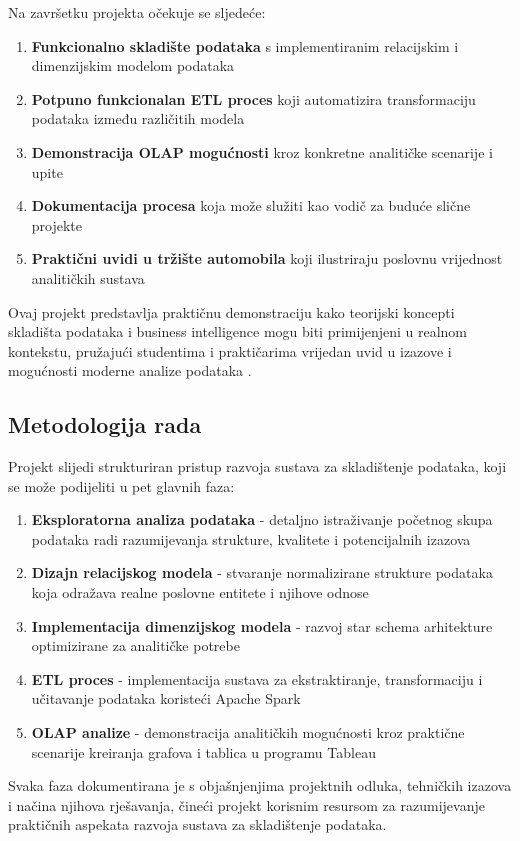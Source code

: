 Na završetku projekta očekuje se sljedeće:

\begin{enumerate}
    \item \textbf{Funkcionalno skladište podataka} s implementiranim relacijskim i dimenzijskim modelom podataka
    \item \textbf{Potpuno funkcionalan ETL proces} koji automatizira transformaciju podataka između različitih modela
    \item \textbf{Demonstracija OLAP mogućnosti} kroz konkretne analitičke scenarije i upite
    \item \textbf{Dokumentacija procesa} koja može služiti kao vodič za buduće slične projekte
    \item \textbf{Praktični uvidi u tržište automobila} koji ilustriraju poslovnu vrijednost analitičkih sustava
\end{enumerate}

Ovaj projekt predstavlja praktičnu demonstraciju kako teorijski koncepti skladišta podataka i business intelligence mogu biti primijenjeni u realnom kontekstu, pružajući studentima i praktičarima vrijedan uvid u izazove i mogućnosti moderne analize podataka \cite{Garani2019}.

\subsection{Metodologija rada}

Projekt slijedi strukturiran pristup razvoja sustava za skladištenje podataka, koji se može podijeliti u pet glavnih faza:

\begin{enumerate}
    \item \textbf{Eksploratorna analiza podataka} - detaljno istraživanje početnog skupa podataka radi razumijevanja strukture, kvalitete i potencijalnih izazova
    \item \textbf{Dizajn relacijskog modela} - stvaranje normalizirane strukture podataka koja odražava realne poslovne entitete i njihove odnose
    \item \textbf{Implementacija dimenzijskog modela} - razvoj star schema arhitekture optimizirane za analitičke potrebe
    \item \textbf{ETL proces} - implementacija sustava za ekstraktiranje, transformaciju i učitavanje podataka koristeći Apache Spark
    \item \textbf{OLAP analize} - demonstracija analitičkih mogućnosti kroz praktične scenarije kreiranja grafova i tablica u programu Tableau
\end{enumerate}

Svaka faza dokumentirana je s objašnjenjima projektnih odluka, tehničkih izazova i načina njihova rješavanja, čineći projekt korisnim resursom za razumijevanje praktičnih aspekata razvoja sustava za skladištenje podataka.
